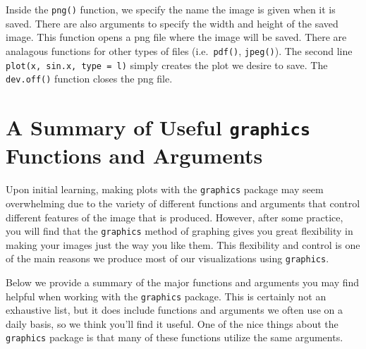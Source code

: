 \documentclass[
]{krantz}
\begin{document}
Inside the \texttt{png()} function, we specify the name the image is given when it is saved. There are also arguments to specify the width and height of the saved image. This function opens a png file where the image will be saved. There are analagous functions for other types of files (i.e.~\texttt{pdf()}, \texttt{jpeg()}). The second line \texttt{plot(x,\ sin.x,\ type\ =\ \textquotesingle{}l\textquotesingle{})} simply creates the plot we desire to save. The \texttt{dev.off()} function closes the png file.

\hypertarget{a-summary-of-useful-graphics-functions-and-arguments}{%
\section{\texorpdfstring{A Summary of Useful \texttt{graphics} Functions and Arguments}{A Summary of Useful graphics Functions and Arguments}}\label{a-summary-of-useful-graphics-functions-and-arguments}}

Upon initial learning, making plots with the \texttt{graphics} package may seem overwhelming due to the variety of different functions and arguments that control different features of the image that is produced. However, after some practice, you will find that the \texttt{graphics} method of graphing gives you great flexibility in making your images just the way you like them. This flexibility and control is one of the main reasons we produce most of our visualizations using \texttt{graphics}.

Below we provide a summary of the major functions and arguments you may find helpful when working with the \texttt{graphics} package. This is certainly not an exhaustive list, but it does include functions and arguments we often use on a daily basis, so we think you'll find it useful. One of the nice things about the \texttt{graphics} package is that many of these functions utilize the same arguments.
\end{document}
